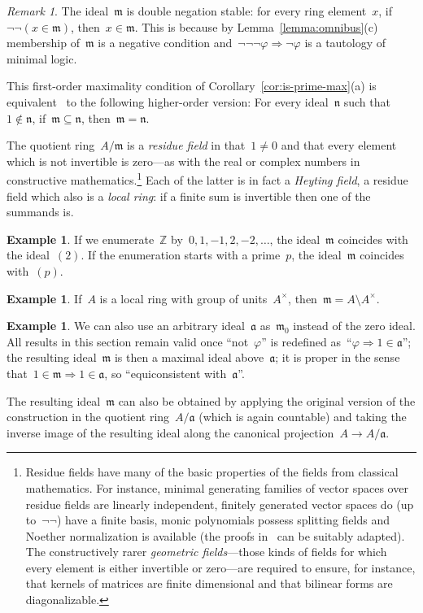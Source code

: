 \documentclass[com,11pt,crcready]{iosart2x}
\theoremstyle{definition}
\newtheorem{example}[definition]{Example}
\theoremstyle{plain}
\theoremstyle{remark}
\newtheorem{remark}[definition]{Remark}
\newcommand{\?}{\,{:}\,}
\newcommand{\aaa}{\mathfrak{a}}
\newcommand{\mmm}{\mathfrak{m}}
\newcommand{\nnn}{\mathfrak{n}}
\newcommand{\ZZ}{\mathbb{Z}}
\renewcommand{\_}{\mathpunct{.}\,}
\begin{document}
\begin{remark}The ideal~$\mmm$ is double negation stable: for every
ring element~$x$, if~$\neg\neg(x \in \mmm)$, then~$x \in \mmm$. This is because
by Lemma~\ref{lemma:omnibus}(c) membership of~$\mmm$ is a negative condition
and~$\neg\neg\neg\varphi \Rightarrow \neg\varphi$ is a tautology of minimal
logic.\end{remark}

This first-order maximality condition of Corollary~\ref{cor:is-prime-max}(a) is
equivalent~\cite{berardi-valentini:krivine} to the following higher-order version: For every ideal~$\nnn$ such that~$1
\not\in \nnn$, if~$\mmm \subseteq \nnn$, then~$\mmm = \nnn$.

The quotient ring~$A/\mmm$ is a \emph{residue field} in that~$1 \neq 0$
and that every element which is not invertible is zero---as with the real or
complex numbers in constructive mathematics.\footnote{Residue fields have
many of the basic properties of the fields from classical mathematics. For
instance, minimal generating families of vector spaces over residue fields are
linearly independent, finitely generated vector spaces do (up to~$\neg\neg$) have
a finite basis, monic polynomials possess splitting fields and Noether
normalization is available (the proofs
in~\cite{mines-richman-ruitenburg:constructive-algebra} can be suitably
adapted). The constructively rarer \emph{geometric fields}---those kinds of
fields for which every element is either invertible or zero---are required to
ensure, for instance, that kernels of matrices are finite dimensional and that bilinear forms
are diagonalizable.}
Each of the latter is in fact a \emph{Heyting field},
a residue field which also is a \emph{local ring}: if a finite
sum is invertible then one of the summands is.

\begin{example}If we enumerate~$\ZZ$ by~$0,1,-1,2,-2,\ldots$, the
ideal~$\mmm$ coincides with the ideal~$(2)$. If the enumeration starts with a
prime~$p$, the ideal~$\mmm$ coincides with~$(p)$.\end{example}

\begin{example}If~$A$ is a local ring with group of units~$A^\times$, then~$\mmm = A \setminus A^\times$.\end{example}

\begin{example}\label{ex:maximal-above}We can also use an
arbitrary ideal~$\aaa$ as~$\mmm_0$ instead of the zero ideal. All results in
this section remain valid once ``not~$\varphi$'' is redefined
as~``$\varphi \Rightarrow 1\in\aaa$''; the resulting ideal~$\mmm$ is then a
maximal ideal above~$\aaa$; it is proper in the sense that~$1 \in \mmm
\Rightarrow 1 \in \aaa$, so ``equiconsistent with~$\aaa$''.

The resulting ideal~$\mmm$ can also be obtained by applying the original
version of the construction in the quotient ring~$A/\aaa$ (which is again
countable) and taking the inverse image of the resulting ideal along the
canonical projection~$A \to A/\aaa$.\end{example}
\end{document}
